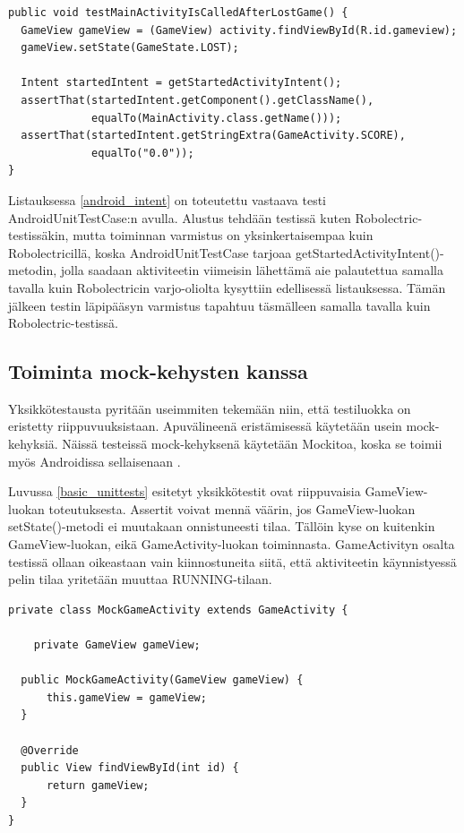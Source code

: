 \begin{lstlisting}[float,label=android_intent,caption=ActivityUnitTestCase intents]
public void testMainActivityIsCalledAfterLostGame() {
  GameView gameView = (GameView) activity.findViewById(R.id.gameview);
  gameView.setState(GameState.LOST);
  	
  Intent startedIntent = getStartedActivityIntent();
  assertThat(startedIntent.getComponent().getClassName(), 
             equalTo(MainActivity.class.getName()));
  assertThat(startedIntent.getStringExtra(GameActivity.SCORE), 
             equalTo("0.0"));
}
\end{lstlisting}

Listauksessa \ref{android_intent} on toteutettu vastaava testi AndroidUnitTestCase:n avulla. Alustus tehdään testissä kuten Robolectric-testissäkin, mutta toiminnan varmistus on yksinkertaisempaa kuin Robolectricillä, koska AndroidUnitTestCase tarjoaa getStartedActivityIntent()-metodin, jolla saadaan aktiviteetin viimeisin lähettämä aie palautettua samalla tavalla kuin Robolectricin varjo-oliolta kysyttiin edellisessä listauksessa. Tämän jälkeen testin läpipääsyn varmistus tapahtuu täsmälleen samalla tavalla kuin Robolectric-testissä.

\subsection{Toiminta mock-kehysten kanssa}

Yksikkötestausta pyritään useimmiten tekemään niin, että testiluokka on eristetty riippuvuuksistaan. Apuvälineenä eristämisessä käytetään usein mock-kehyksiä. Näissä testeissä mock-kehyksenä käytetään Mockitoa, koska se toimii myös Androidissa sellaisenaan \cite{mockito}.

Luvussa \ref{basic_unittests} esitetyt yksikkötestit ovat riippuvaisia GameView-luokan toteutuksesta. Assertit voivat mennä väärin, jos GameView-luokan setState()-metodi ei muutakaan onnistuneesti tilaa. Tällöin kyse on kuitenkin GameView-luokan, eikä GameActivity-luokan toiminnasta. GameActivityn osalta testissä ollaan oikeastaan vain kiinnostuneita siitä, että aktiviteetin käynnistyessä pelin tilaa yritetään muuttaa RUNNING-tilaan.

\begin{lstlisting}[float,label=mock_subclass, caption=Mock Subclass]
private class MockGameActivity extends GameActivity {
	
	private GameView gameView;

  public MockGameActivity(GameView gameView) {
	  this.gameView = gameView;
  }

  @Override
  public View findViewById(int id) {
	  return gameView;
  }
}
\end{lstlisting}

